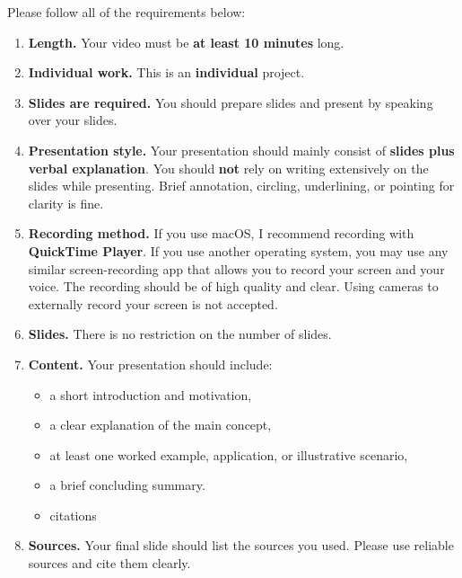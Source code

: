 \documentclass[11pt]{article}
\begin{document}
Please follow all of the requirements below:

\begin{enumerate}[leftmargin=*]
    \item \textbf{Length.} Your video must be \textbf{at least 10 minutes} long.

    \item \textbf{Individual work.} This is an \textbf{individual} project.

    \item \textbf{Slides are required.} You should prepare slides and present by speaking over your slides.

    \item \textbf{Presentation style.} Your presentation should mainly consist of \textbf{slides plus verbal explanation}. You should \textbf{not} rely on writing extensively on the slides while presenting. Brief annotation, circling, underlining, or pointing for clarity is fine.

    \item \textbf{Recording method.} If you use macOS, I recommend recording with \textbf{QuickTime Player}. If you use another operating system, you may use any similar screen-recording app that allows you to record your screen and your voice. The recording should be of high quality and clear. Using cameras to externally record your screen is not accepted.

    \item \textbf{Slides.} There is no restriction on the number of slides.

    \item \textbf{Content.} Your presentation should include:
    \begin{itemize}[leftmargin=*]
        \item a short introduction and motivation,
        \item a clear explanation of the main concept,
        \item at least one worked example, application, or illustrative scenario,
        \item a brief concluding summary.
        \item citations
    \end{itemize}

    \item \textbf{Sources.} Your final slide should list the sources you used. Please use reliable sources and cite them clearly.
\end{enumerate}
\end{document}
